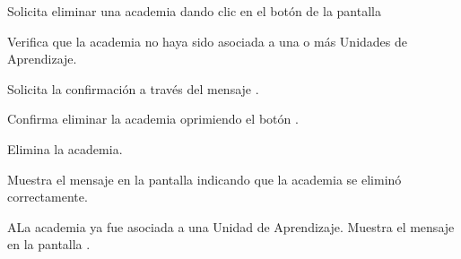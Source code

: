 \begin{UCtrayectoria}
	\UCpaso [\UCactor] Solicita eliminar una academia dando clic en el botón 
	de la pantalla 
	
	\UCpaso [\UCsist] Verifica que la academia no haya sido asociada a una o más Unidades de Aprendizaje. 
	
	\UCpaso [\UCsist] Solicita la confirmación a través del mensaje .
	
	\UCpaso [\UCactor] Confirma eliminar la academia oprimiendo el botón .
	
	\UCpaso [\UCsist] Elimina la academia.
	
	\UCpaso [\UCsist] Muestra el mensaje  en la pantalla  indicando que la academia se eliminó correctamente.	
	
\end{UCtrayectoria}

\begin{UCtrayectoriaA}{A}{La academia ya fue asociada a una Unidad de Aprendizaje.}
	\UCpaso [\UCsist] Muestra el mensaje  en la pantalla . 
\end{UCtrayectoriaA}
